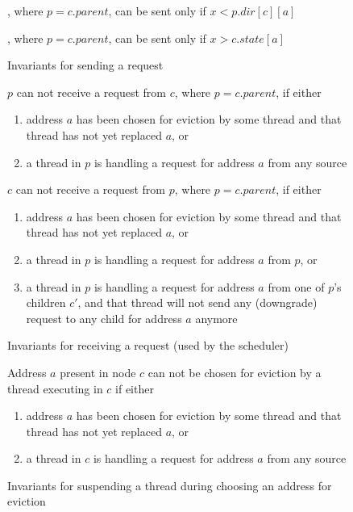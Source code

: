 \begin{figure}
\begin{inv}
, where $p = c.parent$, can be sent only if $x < p.dir[c][a]$
\label{pSendReqPre}
\end{inv}
\begin{inv}
, where $p = c.parent$, can be sent only if $x > c.state[a]$
\label{cSendReqPre}
\end{inv}
\caption{Invariants for sending a request}
\label{sendReq}
\end{figure}

\begin{figure}
\begin{inv}
$p$ can not receive a request  from $c$, where $p = c.parent$,
if either
\begin{enumerate}
\item address $a$ has been chosen for eviction by some thread and that thread
has not yet replaced $a$, or
\item a thread in $p$ is handling a request for address
$a$ from any source
\end{enumerate}
\label{pHandleReq}
\end{inv}
\begin{inv}
$c$ can not receive a request  from $p$, where $p = c.parent$,
if either
\begin{enumerate}
\item address $a$ has been chosen for eviction by some thread and that thread
has not yet replaced $a$, or
\item a thread in $p$ is handling a request for address
$a$ from $p$, or
\item a thread in $p$ is handling a request for address
$a$ from one of $p$'s children $c'$, and that thread will not send any
(downgrade) request to any child for address $a$ anymore
\end{enumerate}
\label{cHandleReq}
\end{inv}
\caption{Invariants for receiving a request (used by the scheduler)}
\label{recvReq}
\end{figure}

\begin{figure}
\begin{inv}
Address $a$ present in node $c$ can not be chosen for eviction by a thread
executing in $c$ if either
\begin{enumerate}
\item address $a$ has been chosen for eviction by some thread and that thread
has not yet replaced $a$, or
\item a thread in $c$ is handling a request for address
$a$ from any source
\end{enumerate}
\label{evict}
\caption{Invariants for suspending a thread during choosing an address for eviction}
\end{inv}
\end{figure}
